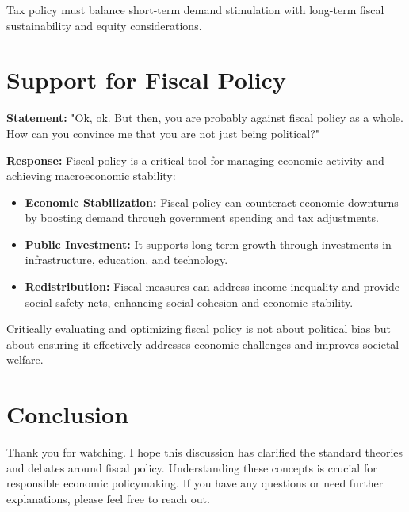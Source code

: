 \documentclass{article}
\begin{document}
Tax policy must balance short-term demand stimulation with long-term fiscal sustainability and equity considerations.

\hrulefill

\section{Support for Fiscal Policy}

\textbf{Statement:} "Ok, ok. But then, you are probably against fiscal policy as a whole. How can you convince me that you are not just being political?"

\textbf{Response:}
Fiscal policy is a critical tool for managing economic activity and achieving macroeconomic stability:

\begin{itemize}
    \item \textbf{Economic Stabilization:} Fiscal policy can counteract economic downturns by boosting demand through government spending and tax adjustments.
    \item \textbf{Public Investment:} It supports long-term growth through investments in infrastructure, education, and technology.
    \item \textbf{Redistribution:} Fiscal measures can address income inequality and provide social safety nets, enhancing social cohesion and economic stability.
\end{itemize}

Critically evaluating and optimizing fiscal policy is not about political bias but about ensuring it effectively addresses economic challenges and improves societal welfare.

\hrulefill

\section{Conclusion}
Thank you for watching. I hope this discussion has clarified the standard theories and debates around fiscal policy. Understanding these concepts is crucial for responsible economic policymaking. If you have any questions or need further explanations, please feel free to reach out.
\end{document}
